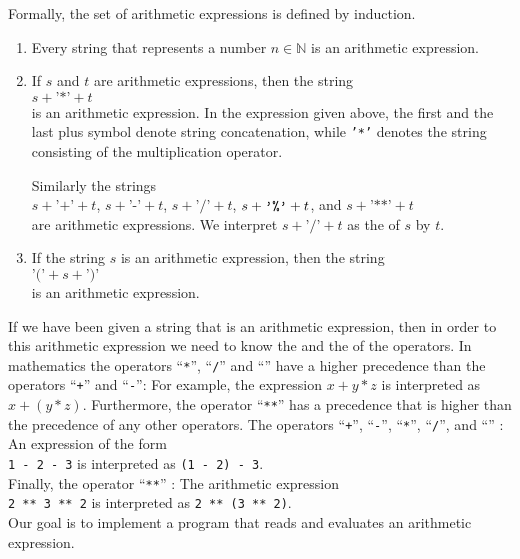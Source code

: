 Formally, the set of arithmetic expressions is defined by induction.
\begin{enumerate}
\item Every string that represents a number $n \in \mathbb{N}$ is an arithmetic expression.
\item If $s$ and $t$ are arithmetic expressions, then the string
      \\[0.2cm]
      \hspace*{1.3cm}
      $s+\texttt{'*'}+t$
      \\[0.2cm]
      is an arithmetic expression.  In the expression given above, the first and the last plus symbol
      denote string concatenation, while \texttt{'*'} denotes the string consisting of the multiplication
      operator. 

      Similarly the strings  
      \\[0.2cm]
      \hspace*{1.3cm}
      $s + \texttt{'+'} + t$, \quad $s + \texttt{'-'} + t$, \quad
      $s + \texttt{'/'} + t$, \quad $s + \texttt{'\symbol{37}'} + t$, \quad and \quad $s +\texttt{'**'} + t$
      \\[0.2cm]
      are arithmetic expressions.  We interpret  $s + \texttt{'/'} + t$ as the  of $s$
      by $t$.
\item If the string $s$ is an arithmetic expression, then the string
      \\[0.2cm]
      \hspace*{1.3cm}
      $\texttt{'('}+ s + \texttt{')'}$ 
      \\[0.2cm]
      is an arithmetic expression.
\end{enumerate}
If we have been given a string that is an arithmetic expression, then in order to  this
arithmetic expression we need to know the  and the
 of the operators.
In mathematics the operators ``\texttt{*}'', ``\texttt{/}'' and ``\texttt{}'' have a
higher precedence than the operators ``\texttt{+}'' and ``\texttt{-}'':  For example, the expression
$x+y*z$ is interpreted as $x + (y * z)$.
 Furthermore, the operator
  ``\texttt{**}'' has a precedence that is higher than the precedence
 of any other operators.  The operators
``\texttt{+}'', ``\texttt{-}'', ``\texttt{*}'', ``\texttt{/}'', and ``\texttt{}''
:  An expression of the form 
\\[0.2cm]
\hspace*{1.3cm} 
\texttt{1 - 2 - 3} \quad is interpreted as \quad \texttt{(1 - 2) - 3}.
 \\[0.2cm]
Finally, the operator ``\texttt{**}'' :
The arithmetic expression \\[0.2cm]
\hspace*{1.3cm} 
\texttt{2 \texttt{**} 3 \texttt{**}  2} \quad is interpreted as \quad 
\texttt{2 \texttt{**} (3 \texttt{**} 2)}. 
\\[0.2cm]
Our goal is to implement a program that reads and evaluates an arithmetic expression.


